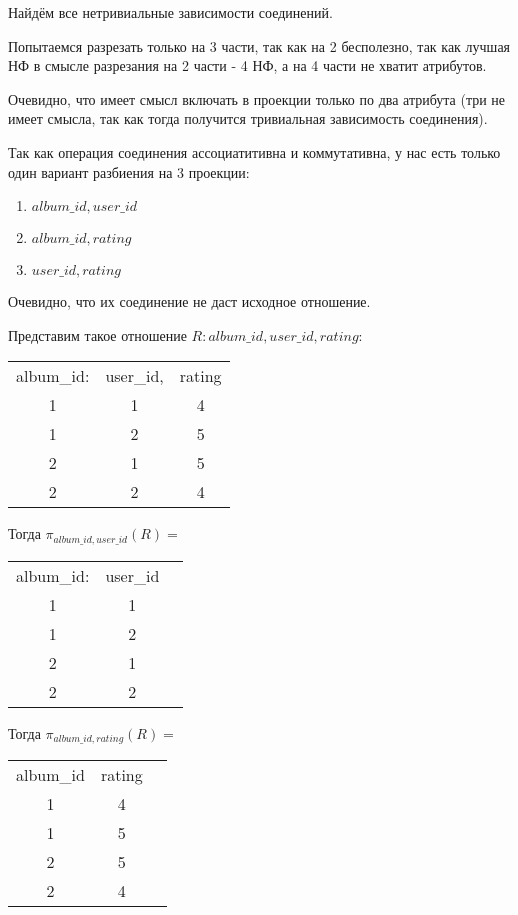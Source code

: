 \documentclass{article}
\begin{document}
	Найдём все нетривиальные зависимости соединений.
	
	Попытаемся разрезать только на 3 части, так как на 2 бесполезно, так как лучшая НФ в смысле разрезания на 2 части - 4 НФ, а на 4 части не хватит атрибутов.
	
	Очевидно, что имеет смысл включать в проекции только по два атрибута (три не имеет смысла, так как тогда получится тривиальная зависимость соединения).
	
	Так как операция соединения ассоциатитивна и коммутативна, у нас есть только один вариант разбиения на 3 проекции:
	
	\begin{enumerate}
		\item $album\_id, user\_id$
		\item $album\_id, rating$
		\item $user\_id, rating$
	\end{enumerate}

	Очевидно, что их соединение не даст исходное отношение. 
	
	Представим такое отношение $R: album\_id, user\_id, rating$:
	
	\begin{center}
		\begin{tabular}{ccc}
			album\_id: & user\_id,& rating \\
			1 & 1 & 4\\ 
			1 & 2& 5 \\
			2 & 1 & 5\\
			2 & 2 & 4 \\
		\end{tabular}
	\end{center}

	Тогда $\pi_{album\_id, user\_id}(R) = $
	
		\begin{center}
		\begin{tabular}{ccc}
			album\_id: & user\_id \\
			1 & 1\\
			1 & 2 \\
			2 & 1 \\
			2 & 2 \\
		\end{tabular}
	\end{center}

	Тогда $\pi_{album\_id, rating}(R) = $
	
	\begin{center}
		\begin{tabular}{ccc}
			album\_id & rating \\
			1 & 4\\
			1 & 5 \\
			2 & 5\\
			2 & 4\\
		\end{tabular}
	\end{center}
\end{document}
